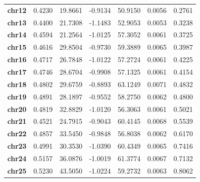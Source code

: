 \documentclass[12pt,a4paper]{article}
\begin{document}
\begin{table}[H]
{\begin{tabular}{lcccccc}
			\textbf{chr12}      & 0.4230              & 19.8661           & -0.9134           & 50.9150              & 0.0056                & 0.2761         \\
			\textbf{chr13}      & 0.4400              & 21.7308           & -1.1483           & 52.9053              & 0.0053                & 0.3238         \\
			\textbf{chr14}      & 0.4594              & 21.2564           & -1.0125           & 57.3052              & 0.0061                & 0.3725         \\
			\textbf{chr15}      & 0.4616              & 29.8504           & -0.9730           & 59.3889              & 0.0065                & 0.3987         \\
			\textbf{chr16}      & 0.4717              & 26.7848           & -1.0122           & 57.2724              & 0.0061                & 0.4225         \\
			\textbf{chr17}      & 0.4746              & 28.6704           & -0.9908           & 57.1325              & 0.0061                & 0.4154         \\
			\textbf{chr18}      & 0.4802              & 29.6759           & -0.8893           & 63.1249              & 0.0071                & 0.4832         \\
			\textbf{chr19}      & 0.4891              & 28.1897           & -0.9552           & 58.2750              & 0.0062                & 0.4800         \\
			\textbf{chr20}      & 0.4819              & 32.8829           & -1.0120           & 56.3063              & 0.0061                & 0.5021         \\
			\textbf{chr21}      & 0.4521              & 24.7915           & -0.9043           & 60.4145              & 0.0068                & 0.5539         \\
			\textbf{chr22}      & 0.4857              & 33.5450           & -0.9848           & 56.8038              & 0.0062                & 0.6170         \\
			\textbf{chr23}      & 0.4991              & 30.3530           & -1.0390           & 60.4349              & 0.0065                & 0.7416         \\
			\textbf{chr24}      & 0.5157              & 36.0876           & -1.0019           & 61.3774              & 0.0067                & 0.7132         \\
			\textbf{chr25}      & 0.5230              & 43.5050           & -1.0224           & 59.2732              & 0.0063                & 0.8062         \\

\end{tabular}}
\end{table}
\end{document}
